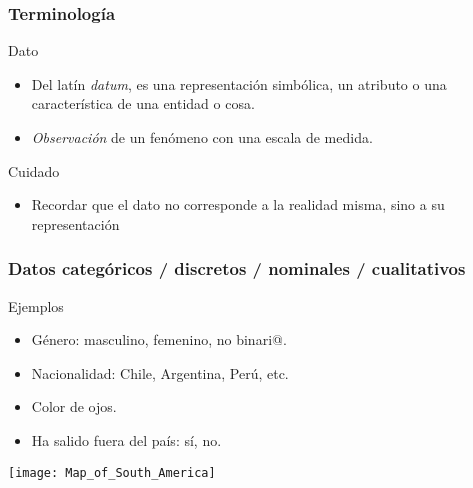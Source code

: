 \documentclass[table]{beamer}
\begin{document}
\begin{frame}
    \frametitle{Terminología}
    \begin{block}{Dato}
        \begin{itemize}
            \item Del latín \emph{datum}, es una representación simbólica, un atributo o una característica de una entidad o cosa.
            \item \emph{Observación} de un fenómeno con una escala de medida.
        \end{itemize}
    \end{block}
    \begin{alertblock}{Cuidado}
        \begin{itemize}
            \item Recordar que el dato no corresponde a la realidad misma, sino a su representación
        \end{itemize}
    \end{alertblock}
\end{frame}

\iffalse
\begin{frame}
    \frametitle{Terminología -- Tipos de datos}
    \begin{block}{Según escala de medida}
        \begin{itemize}
            \item Categóricos: escala nominal.
            \item Ordinales: escala ordinal.
            \item Contínuos: escala intervalar o de razón.
        \end{itemize}
    \end{block}
\end{frame}
\fi

\begin{frame}
    \frametitle{Datos categóricos / discretos / nominales / cualitativos}
    \begin{exampleblock}{Ejemplos}
        \begin{itemize}
            \item Género: masculino, femenino, no binari@.
            \item Nacionalidad: Chile, Argentina, Perú, etc.
            \item Color de ojos.
            \item Ha salido fuera del país: sí, no.
        \end{itemize}
    \end{exampleblock}
    \begin{center}
        \texttt{[image: Map\_of\_South\_America]}
    \end{center}
\end{frame}
\end{document}
